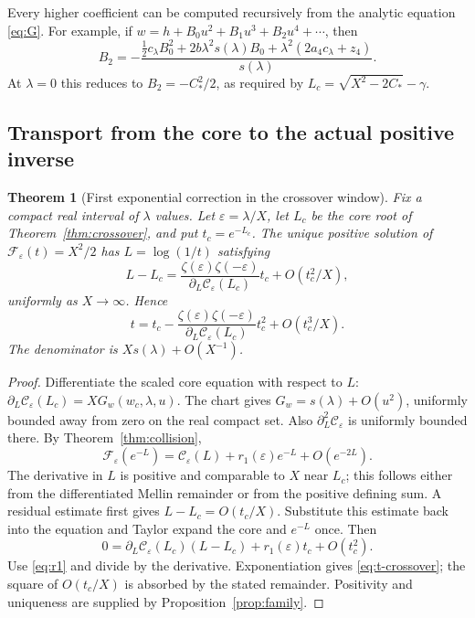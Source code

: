 \documentclass[11pt,a4paper]{article}
\numberwithin{equation}{section}
\newtheorem{theorem}{Theorem}[section]
\theoremstyle{definition}\newtheorem{definition}[theorem]{Definition}
\theoremstyle{remark}\newtheorem{remark}[theorem]{Remark}
\newcommand{\eps}{\varepsilon}
\newcommand{\F}{\mathcal F}\newcommand{\CC}{\mathcal C}
\begin{document}
Every higher coefficient can be computed recursively from the analytic
equation \eqref{eq:G}. For example, if
$w=h+B_0u^2+B_1u^3+B_2u^4+\cdots$, then
\begin{equation}\label{eq:B2}
 B_2=-\frac{\tfrac12c_\lambda B_0^2
      +2b\lambda^2s(\lambda)B_0
      +\lambda^2(2a_4c_\lambda+z_4)}{s(\lambda)}.
\end{equation}
At $\lambda=0$ this reduces to $B_2=-C_*^2/2$, as required by
$L_c=\sqrt{X^2-2C_*}-\gamma$.

\subsection{Transport from the core to the actual positive inverse}
\begin{theorem}[First exponential correction in the crossover window]
\label{thm:actual-crossover}
Fix a compact real interval of $\lambda$ values. Let
$\eps=\lambda/X$, let $L_c$ be the core root of
Theorem~\ref{thm:crossover}, and put $t_c=e^{-L_c}$.
The unique positive solution of $\F_\eps(t)=X^2/2$ has
$L=\log(1/t)$ satisfying
\begin{equation}\label{eq:actual-crossover}
 L-L_c=\frac{\zeta(\eps)\zeta(-\eps)}
                 {\partial_L\CC_\eps(L_c)}t_c
       +O(t_c^2/X),
\end{equation}
uniformly as $X\to\infty$. Hence
\begin{equation}\label{eq:t-crossover}
 t=t_c-\frac{\zeta(\eps)\zeta(-\eps)}
                 {\partial_L\CC_\eps(L_c)}t_c^2
       +O(t_c^3/X).
\end{equation}
The denominator is $Xs(\lambda)+O(X^{-1})$.
\end{theorem}
\begin{proof}
Differentiate the scaled core equation with respect to $L$:
$\partial_L\CC_\eps(L_c)=XG_w(w_c,\lambda,u)$.
The chart gives $G_w=s(\lambda)+O(u^2)$, uniformly bounded away
from zero on the real compact set. Also $\partial_L^2\CC_\eps$
is uniformly bounded there. By Theorem~\ref{thm:collision},
\[
 \F_\eps(e^{-L})=\CC_\eps(L)+r_1(\eps)e^{-L}+O(e^{-2L}).
\]
The derivative in $L$ is positive and comparable to $X$ near $L_c$;
this follows either from the differentiated Mellin remainder or from
the positive defining sum. A residual estimate first gives
$L-L_c=O(t_c/X)$. Substitute this estimate back into the equation
and Taylor expand the core and $e^{-L}$ once. Then
\[
 0=\partial_L\CC_\eps(L_c)(L-L_c)+r_1(\eps)t_c+O(t_c^2).
\]
Use \eqref{eq:r1} and divide by the derivative. Exponentiation gives
\eqref{eq:t-crossover}; the square of $O(t_c/X)$ is absorbed by
the stated remainder. Positivity and uniqueness are supplied by
Proposition~\ref{prop:family}.
\end{proof}
\end{document}
